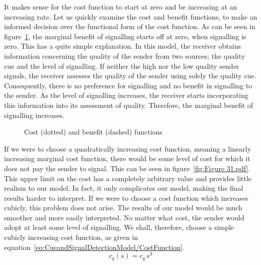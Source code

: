 \documentclass[a4paper,12pt]{article}
\numberwithin{equation}{section}
\begin{document}
It makes sense for the cost function to start at zero and be increasing at an increasing rate. Let us quickly examine the cost and benefit functions, to make an informed decision over the functional form of the cost function. As can be seen in figure~\ref{fig:Figure 3132}, the marginal benefit of signalling starts off at zero, when signalling is zero. This has a quite simple explanation. In this model, the receiver obtains information concerning the quality of the sender from two sources; the quality cue and the level of signalling. If neither the high nor the low quality sender signals, the receiver assesses the quality of the sender using solely the quality cue. Consequently, there is no preference for signalling and no benefit in signalling to the sender. As the level of signalling increases, the receiver starts incorporating this information into its assessment of quality. Therefore, the marginal benefit of signalling increases.
\begin{figure}[h]
\begin{center}
\hspace{8mm}
\caption{Cost (dotted) and benefit (dashed) functions}
\label{fig:Figure 3132}
\end{center}
\end{figure}
 
If we were to choose a quadratically increasing cost function, meaning a linearly increasing marginal cost function, there would be some level of cost for which it does not pay the sender to signal. This can be seen in figure~\ref{fig:Figure 31.pdf}. This upper limit on the cost has a completely arbitrary value and provides little realism to our model. In fact, it only complicates our model, making the final results harder to interpret. If we were to choose a cost function which increases cubicly, this problem does not arise. The results of our model would be much smoother and more easily interpreted. No matter what cost, the sender would adopt at least some level of signalling. We shall, therefore, choose a simple cubicly increasing cost function, as given in equation~\ref{eq:CueandSignalDetectionModel/CostFunction}.
\begin{equation}
\label{eq:CueandSignalDetectionModel/CostFunction}
c_{q}(s)=c_{q} \, s^{3}
\end{equation}
\end{document}
